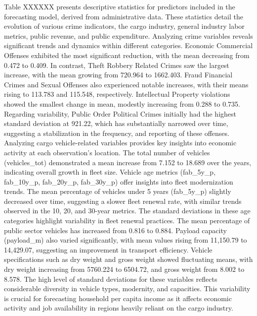 Table XXXXXX presents descriptive statistics for predictors included in the forecasting model, derived from administrative data. These statistics detail the evolution of various crime indicators, the cargo industry, general industry labor metrics, public revenue, and public expenditure. Analyzing crime variables reveals significant trends and dynamics within different categories. Economic Commercial Offenses exhibited the most significant reduction, with the mean decreasing from 0.472 to 0.409. In contrast, Theft Robbery Related Crimes saw the largest increase, with the mean growing from 720.964 to 1662.403. Fraud Financial Crimes and Sexual Offenses also experienced notable increases, with their means rising to 113.783 and 115.548, respectively. Intellectual Property violations showed the smallest change in mean, modestly increasing from 0.288 to 0.735. Regarding variability, Public Order Political Crimes initially had the highest standard deviation at 921.22, which has substantially narrowed over time, suggesting a stabilization in the frequency, and reporting of these offenses.
Analyzing cargo vehicle-related variables provides key insights into economic activity at each observation's location. The total number of vehicles (vehicles_tot) demonstrated a mean increase from 7.152 to 18.689 over the years, indicating overall growth in fleet size. Vehicle age metrics (fab_5y_p, fab_10y_p, fab_20y_p, fab_30y_p) offer insights into fleet modernization trends. The mean percentage of vehicles under 5 years (fab_5y_p) slightly decreased over time, suggesting a slower fleet renewal rate, with similar trends observed in the 10, 20, and 30-year metrics. The standard deviations in these age categories highlight variability in fleet renewal practices. The mean percentage of public sector vehicles has increased from 0.816 to 0.884. Payload capacity (payload_m) also varied significantly, with mean values rising from 11,150.79 to 14,429.07, suggesting an improvement in transport efficiency. Vehicle specifications such as dry weight and gross weight showed fluctuating means, with dry weight increasing from 5760.224 to 6504.72, and gross weight from 8.002 to 8.578. The high level of standard deviations for these variables reflects considerable diversity in vehicle types, modernity, and capacities. This variability is crucial for forecasting household per capita income as it affects economic activity and job availability in regions heavily reliant on the cargo industry.
